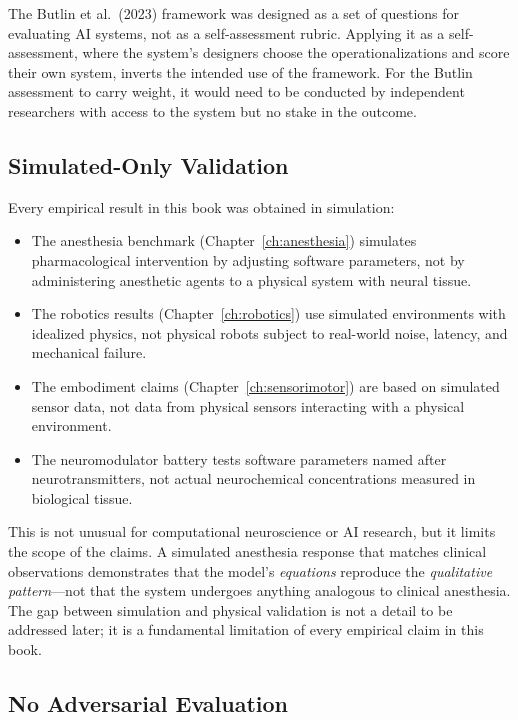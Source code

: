 \documentclass[12pt]{book}
\begin{document}
The Butlin et al.\ (2023) framework was designed as a set of questions for evaluating AI systems, not as a self-assessment rubric. Applying it as a self-assessment, where the system's designers choose the operationalizations and score their own system, inverts the intended use of the framework. For the Butlin assessment to carry weight, it would need to be conducted by independent researchers with access to the system but no stake in the outcome.

\subsection{Simulated-Only Validation}

Every empirical result in this book was obtained in simulation:

\begin{itemize}
  \item The anesthesia benchmark (Chapter~\ref{ch:anesthesia}) simulates pharmacological intervention by adjusting software parameters, not by administering anesthetic agents to a physical system with neural tissue.
  \item The robotics results (Chapter~\ref{ch:robotics}) use simulated environments with idealized physics, not physical robots subject to real-world noise, latency, and mechanical failure.
  \item The embodiment claims (Chapter~\ref{ch:sensorimotor}) are based on simulated sensor data, not data from physical sensors interacting with a physical environment.
  \item The neuromodulator battery tests software parameters named after neurotransmitters, not actual neurochemical concentrations measured in biological tissue.
\end{itemize}

This is not unusual for computational neuroscience or AI research, but it limits the scope of the claims. A simulated anesthesia response that matches clinical observations demonstrates that the model's \textit{equations} reproduce the \textit{qualitative pattern}---not that the system undergoes anything analogous to clinical anesthesia. The gap between simulation and physical validation is not a detail to be addressed later; it is a fundamental limitation of every empirical claim in this book.

\subsection{No Adversarial Evaluation}
\end{document}
